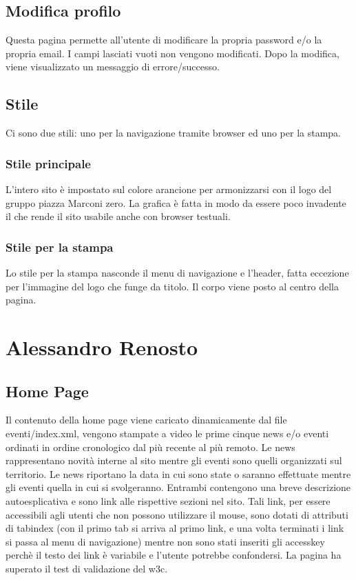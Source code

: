 \documentclass[a4paper,10pt]{article}
\begin{document}
\subsection{Modifica profilo}

Questa pagina permette all'utente di modificare la propria password e/o la propria email. I campi lasciati vuoti non vengono modificati. Dopo la modifica, viene visualizzato un messaggio di errore/successo.

\subsection{Stile}

Ci sono due stili: uno per la navigazione tramite browser ed uno per la stampa.

\subsubsection{Stile principale}
L'intero sito \`e impostato sul colore arancione per armonizzarsi con il logo del gruppo piazza Marconi zero. La grafica \`e fatta in modo da essere poco invadente il che rende il sito usabile anche con browser testuali.

\subsubsection{Stile per la stampa}
Lo stile per la stampa nasconde il menu di navigazione e l'header, fatta eccezione per l'immagine del logo che funge da titolo. Il corpo viene posto al centro della pagina.

\section{Alessandro Renosto}

\subsection{Home Page}

Il contenuto della home page viene caricato dinamicamente dal file eventi/index.xml, vengono stampate a video le prime cinque news e/o eventi ordinati in ordine cronologico dal pi\`u recente al pi\`u remoto. Le news rappresentano novit\`a interne al sito mentre gli eventi sono quelli organizzati sul territorio. Le news riportano la data in cui sono state o saranno effettuate mentre gli eventi quella in cui si svolgeranno. Entrambi contengono una breve descrizione autoesplicativa e sono link alle rispettive sezioni nel sito. Tali link, per essere accessibili agli utenti che non possono utilizzare il mouse, sono dotati di attributi di tabindex (con il primo tab si arriva al primo link, e una volta terminati i link si passa al menu di navigazione) mentre non sono stati inseriti gli accesskey perch\`e il testo dei link \`e variabile e l'utente potrebbe confondersi. La pagina ha superato il test di validazione del w3c.
\end{document}

